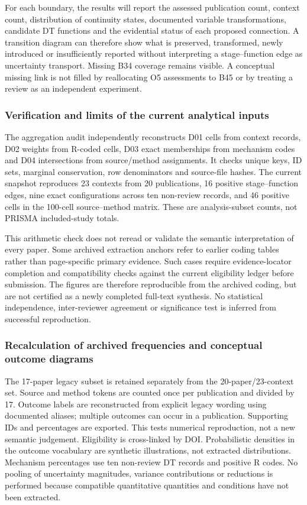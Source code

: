 For each boundary, the results will report the assessed publication count, context count, distribution of continuity states, documented variable transformations, candidate DT functions and the evidential status of each proposed connection. A transition diagram can therefore show what is preserved, transformed, newly introduced or insufficiently reported without interpreting a stage–function edge as uncertainty transport. Missing B34 coverage remains visible. A conceptual missing link is not filled by reallocating O5 assessments to B45 or by treating a review as an independent experiment.

\subsubsection{Verification and limits of the current analytical inputs}
The aggregation audit independently reconstructs D01 cells from context records, D02 weights from R-coded cells, D03 exact memberships from mechanism codes and D04 intersections from source/method assignments. It checks unique keys, ID sets, marginal conservation, row denominators and source-file hashes. The current snapshot reproduces 23 contexts from 20 publications, 16 positive stage–function edges, nine exact configurations across ten non-review records, and 46 positive cells in the 100-cell source–method matrix. These are analysis-subset counts, not PRISMA included-study totals.

This arithmetic check does not reread or validate the semantic interpretation of every paper. Some archived extraction anchors refer to earlier coding tables rather than page-specific primary evidence. Such cases require evidence-locator completion and compatibility checks against the current eligibility ledger before submission. The figures are therefore reproducible from the archived coding, but are not certified as a newly completed full-text synthesis. No statistical independence, inter-reviewer agreement or significance test is inferred from successful reproduction.

\subsubsection{Recalculation of archived frequencies and conceptual outcome diagrams}
The 17-paper legacy subset is retained separately from the 20-paper/23-context set. Source and method tokens are counted once per publication and divided by 17. Outcome labels are reconstructed from explicit legacy wording using documented aliases; multiple outcomes can occur in a publication. Supporting IDs and percentages are exported. This tests numerical reproduction, not a new semantic judgement. Eligibility is cross-linked by DOI. Probabilistic densities in the outcome vocabulary are synthetic illustrations, not extracted distributions. Mechanism percentages use ten non-review DT records and positive R codes. No pooling of uncertainty magnitudes, variance contributions or reductions is performed because compatible quantitative quantities and conditions have not been extracted.

